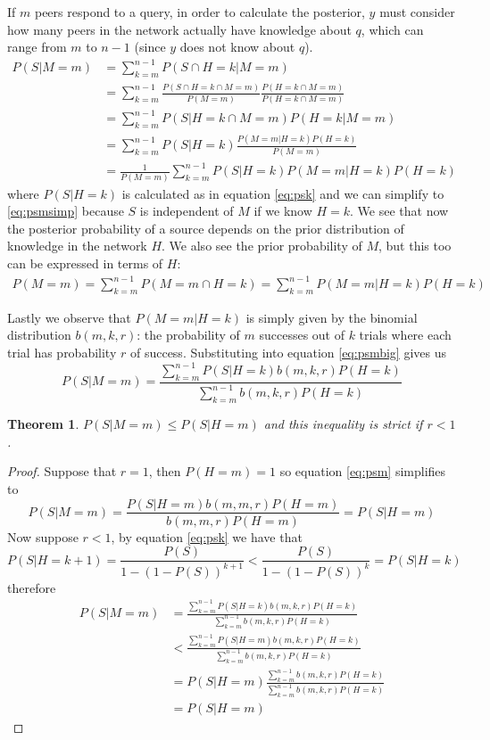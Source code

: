 \documentclass{article}
\newcommand{\eqnref}[1]{equation \eqref{eq:#1}}
\newtheorem{theorem}{Theorem}
\begin{document}
If $m$ peers respond to a query, in order to calculate the posterior, $y$ must
consider how many peers in the network actually have knowledge about $q$, which
can range from $m$ to $n-1$ (since $y$ does not know about $q$).
\begin{align}
	P(S|M=m)&=\sum_{k=m}^{n-1}P(S\cap H=k|M=m)\nonumber\\
	&=\sum_{k=m}^{n-1}\frac{P(S\cap H=k\cap M=m)}{P(M=m)}\frac{P(H=k\cap
	M=m)}{P(H=k\cap M=m)}\nonumber\\
	&=\sum_{k=m}^{n-1}P(S|H=k\cap M=m)P(H=k|M=m)\nonumber\\
	&=\sum_{k=m}^{n-1}P(S|H=k)\frac{P(M=m|H=k)P(H=k)}{P(M=m)}\label{eq:psmsimp}\\
	&=\frac{1}{P(M=m)}\sum_{k=m}^{n-1}P(S|H=k)P(M=m|H=k)P(H=k)\label{eq:psmbig}
\end{align}
where $P(S|H=k)$ is calculated as in \eqnref{psk} and we can simplify to
\eqref{eq:psmsimp} because $S$ is independent of $M$ if we know $H=k$.
We see that now the posterior probability of a source depends on the prior
distribution of knowledge in the network $H$. We also see the prior probability
of $M$, but this too can be expressed in terms of $H$:
\begin{align*}
	P(M=m)=\sum_{k=m}^{n-1}P(M=m\cap H=k)=\sum_{k=m}^{n-1}P(M=m|H=k)P(H=k)
\end{align*}

Lastly we observe that $P(M=m|H=k)$ is simply given by the binomial
distribution $b(m,k,r)$: the probability of $m$ successes out of $k$ trials where
each trial has probability $r$ of success. Substituting into \eqnref{psmbig} gives us
\begin{equation}\label{eq:psm}
	P(S|M=m)=\frac{\sum_{k=m}^{n-1}P(S|H=k)b(m,k,r)P(H=k)}{\sum_{k=m}^{n-1}b(m,k,r)P(H=k)}
\end{equation}

\begin{theorem}\label{th:rbound}
	$P(S|M=m)\le P(S|H=m)$ and this inequality is strict if $r<1$.
\end{theorem}
\begin{proof}
	Suppose that $r=1$, then $P(H=m)=1$ so \eqnref{psm} simplifies to
	\begin{equation*}
		P(S|M=m)=\frac{P(S|H=m)b(m,m,r)P(H=m)}{b(m,m,r)P(H=m)}=P(S|H=m)
	\end{equation*}
	Now suppose $r<1$, by \eqnref{psk} we have that
	\begin{equation*}
		P(S|H=k+1)=\frac{P(S)}{1-(1-P(S))^{k+1}}<\frac{P(S)}{1-(1-P(S))^k}=P(S|H=k)
	\end{equation*}
	therefore
	\begin{align*}
		P(S|M=m)&=\frac{\sum_{k=m}^{n-1}P(S|H=k)b(m,k,r)P(H=k)}{\sum_{k=m}^{n-1}b(m,k,r)P(H=k)}\\
		&<\frac{\sum_{k=m}^{n-1}P(S|H=m)b(m,k,r)P(H=k)}{\sum_{k=m}^{n-1}b(m,k,r)P(H=k)}\\
		&=P(S|H=m)\frac{\sum_{k=m}^{n-1}b(m,k,r)P(H=k)}{\sum_{k=m}^{n-1}b(m,k,r)P(H=k)}\\
		&=P(S|H=m)
	\end{align*}
\end{proof}
\end{document}
